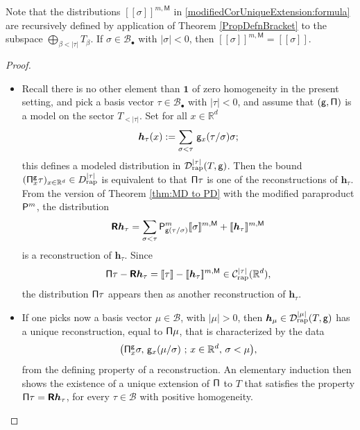 \documentclass[11pt]{article}
\newcommand{\skpt}{\smallskip}
\numberwithin{equation}{section}
\newcommand{\sbullet}{{\scriptscriptstyle\bullet}}
\theoremstyle{plain}
\theoremstyle{definition}
\newcommand{\unit}{\mathbf{1}}
\newcommand{\Brac}[1]{[\![#1]\!]}
\newcommand{\bsh}{\boldsymbol{h}}
\newcommand{\rap}{\mathrm{rap}}
\newcommand{\reR}{\boldsymbol{\mathsf{R}}}
\newcommand{\sfM}{\mathsf{M}}
\newcommand{\bbR}{\mathbb{R}}
\newcommand{\mcB}{\mathcal{B}}
\newcommand{\mcC}{\mathcal{C}}
\newcommand{\mcD}{\mathcal{D}}
\begin{document}
Note that the distributions $\Brac{\sigma}^{m,\sfM}$ in \eqref{modifiedCorUniqueExtension:formula} are recursively defined by application of Theorem \ref{PropDefnBracket} to the subspace $\bigoplus_{\beta<|\tau|}T_\beta$. If $\sigma\in\mcB_\sbullet$ with $\vert\sigma\vert<0$, then $\Brac{\sigma}^{m,\sfM}=\Brac{\sigma}$.

\skpt
\begin{proof}
\begin{itemize}
\item
Recall there is no other element than $\unit$ of zero homogeneity in the present setting, and pick a basis vector $\tau\in\mcB_\sbullet$ with $|\tau|<0$, and assume that $\sf(g,\Pi)$ is a model on the sector $T_{<|\tau|}$. Set for all $x\in\bbR^d$
\[
\bsh_\tau(x) := \sum_{\sigma<\tau}\, {\sf g}_x(\tau/\sigma)\sigma;
\]
this defines a modeled distribution in $\mcD_\rap^{|\tau|}(T,{\sf g})$. Then the bound $({\sf\Pi}_x^{\sf g}\tau)_{x\in\bbR^d}\in D_{\rap}^{|\tau|}$
is equivalent to that ${\sf \Pi}\tau$ is one of the reconstructions of $\bsh_\tau$. From the version of Theorem \ref{thm:MD to PD} with the modified paraproduct ${\sf P}^m$, the distribution
\[
\reR\bsh_\tau
=\sum_{\sigma<\tau} {\sf P}^m_{{\sf g}(\tau/\sigma)}\Brac{\sigma}^{m,{\sf M}} + \Brac{\bsh_\tau}^{m,{\sf M}}
\]
is a reconstruction of $\bsh_\tau$. Since
\[
{\sf \Pi}\tau - \reR\bsh_\tau = \Brac{\tau} - \Brac{\bsh_\tau}^{m,{\sf M}} \in \mcC_\rap^{|\tau|}(\bbR^d),
\]
the distribution ${\sf \Pi}\tau$ appears then as another reconstruction of $\bsh_\tau$.

\item
If one picks now a basis vector $\mu\in\mcB$, with $|\mu|>0$, then $\bsh_\mu\in\mcD_\rap^{|\mu|}(T,{\sf g})$ has a unique reconstruction, equal to ${\sf \Pi}\mu$, that is characterized by the data
\[
\bigl({\sf\Pi}_x^{\sf g}\sigma,\, {\sf g}_x(\mu/\sigma)\ ;\, x\in\bbR^d,\, \sigma<\mu\bigr),
\]
from the defining property of a reconstruction. An elementary induction then shows the existence of a unique extension of $\sf \Pi$ to $T$ that satisfies the property ${\sf \Pi}\tau = \reR\bsh_\tau$, for every $\tau\in\mcB$ with positive homogeneity.\qedhere
\end{itemize}
\end{proof}
\end{document}
